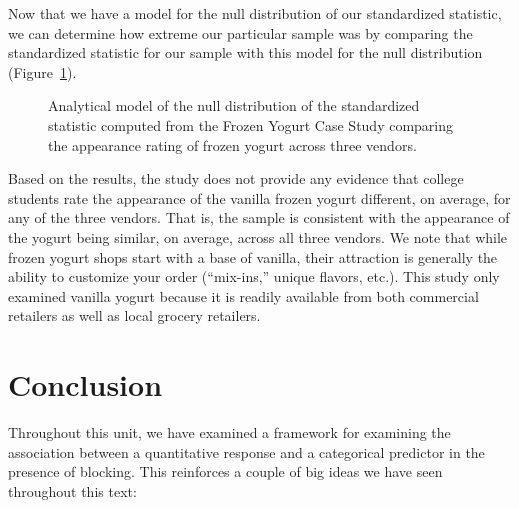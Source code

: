 \documentclass[
  letterpaper,
  DIV=11,
  numbers=noendperiod]{scrreprt}
\theoremstyle{plain}
\theoremstyle{definition}
\theoremstyle{definition}
\theoremstyle{remark}
\begin{document}
Now that we have a model for the null distribution of our standardized
statistic, we can determine how extreme our particular sample was by
comparing the standardized statistic for our sample with this model for
the null distribution (Figure~\ref{fig-blockrecap-null-distribution}).

\begin{figure}


\caption{\label{fig-blockrecap-null-distribution}Analytical model of the
null distribution of the standardized statistic computed from the Frozen
Yogurt Case Study comparing the appearance rating of frozen yogurt
across three vendors.}

\end{figure}%

Based on the results, the study does not provide any evidence that
college students rate the appearance of the vanilla frozen yogurt
different, on average, for any of the three vendors. That is, the sample
is consistent with the appearance of the yogurt being similar, on
average, across all three vendors. We note that while frozen yogurt
shops start with a base of vanilla, their attraction is generally the
ability to customize your order (``mix-ins,'' unique flavors, etc.).
This study only examined vanilla yogurt because it is readily available
from both commercial retailers as well as local grocery retailers.

\section{Conclusion}\label{conclusion-1}

Throughout this unit, we have examined a framework for examining the
association between a quantitative response and a categorical predictor
in the presence of blocking. This reinforces a couple of big ideas we
have seen throughout this text:
\end{document}
